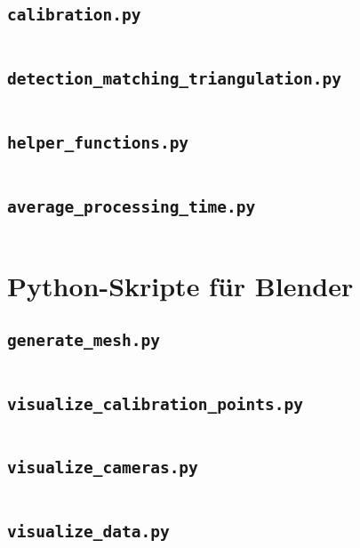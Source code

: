 \documentclass[a4paper,12pt]{report}
\begin{document}
		\subsection{\texttt{calibration.py}}
			\inputminted[linenos,breaklines,tabsize=2,bgcolor=mybg,fontsize=\small]{python}{pretty_code/calibration.py}
		\subsection{\texttt{detection\_matching\_triangulation.py}}
			\inputminted[linenos,breaklines,tabsize=2,bgcolor=mybg,fontsize=\small]{python}{pretty_code/detection_matching_triangulation.py}
		\subsection{\texttt{helper\_functions.py}}
			\inputminted[linenos,breaklines,tabsize=2,bgcolor=mybg,fontsize=\small]{python}{pretty_code/helper_functions.py}
		\subsection{\texttt{average\_processing\_time.py}}
			\inputminted[linenos,breaklines,tabsize=2,bgcolor=mybg,fontsize=\small]{python}{pretty_code/average_processing_time.py}
	\section{Python-Skripte für Blender}%
		\subsection{\texttt{generate\_mesh.py}}
			\inputminted[linenos,breaklines,tabsize=2,bgcolor=mybg,fontsize=\small]{python}{pretty_code/generate_mesh.py}
		\subsection{\texttt{visualize\_calibration\_points.py}}
			\inputminted[linenos,breaklines,tabsize=2,bgcolor=mybg,fontsize=\small]{python}{pretty_code/visualize_calibration_points.py}
		\subsection{\texttt{visualize\_cameras.py}}
			\inputminted[linenos,breaklines,tabsize=2,bgcolor=mybg,fontsize=\small]{python}{pretty_code/visualize_cameras.py}
		\subsection{\texttt{visualize\_data.py}}
			\inputminted[linenos,breaklines,tabsize=2,bgcolor=mybg,fontsize=\small]{python}{pretty_code/visualize_data.py}
				
\end{document}
